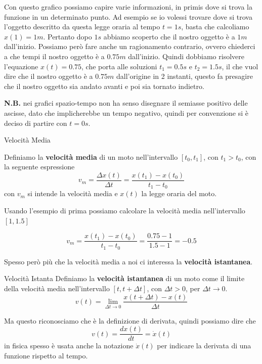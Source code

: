 \documentclass{rapport}
\begin{document}
Con questo grafico possiamo capire varie informazioni, in primis dove si trova la funzione in un determinato punto. Ad esempio se io volessi trovare dove si trova l'oggetto descritto da questa legge oraria al tempo $t=1s$, basta che calcoliamo $x(1)=1m$. Pertanto dopo $1s$ abbiamo scoperto che il nostro oggetto è a $1m$ dall'inizio.  Possiamo però fare anche un ragionamento contrario, ovvero chiederci a che tempi il nostro oggetto è a $0.75m$ dall'inizio. Quindi dobbiamo risolvere l'equazione $x(t)=0.75$, che porta alle soluzioni $t_1=0.5s $ e $t_2 = 1.5s$, il che vuol dire che il nostro oggetto è a $0.75m$ dall'origine in 2 instanti, questo fa presagire che il nostro oggetto sia andato avanti e poi sia tornato indietro.

\textbf{N.B.} nei grafici spazio-tempo non ha senso disegnare il semiasse positivo delle ascisse, dato che implicherebbe un tempo negativo, quindi per convenzione si è deciso di partire con $t=0s$. 


\begin{definizione}{Velocità Media}{}
  Definiamo la \textbf{velocità media} di un moto nell'intervallo $[t_0, t_1]$, con $t_1 > t_0$, con la seguente espressione 
  \begin{equation*}
    v_m = \dfrac{\Delta x(t)}{\Delta t} = \dfrac{x(t_1) - x(t_0)}{t_1-t_0}
  \end{equation*}
  con $v_m$ si intende la velocità media e $x(t)$ la legge oraria del moto.
\end{definizione}

Usando l'esempio di prima possiamo calcolare la velocità media nell'intervallo $[1,1.5]$

\[
v_m = \dfrac{x(t_1) - x(t_0)}{t_1-t_0} = \dfrac{0.75 - 1}{1.5-1}= -0.5
\]

Spesso però più che la velocità media a noi ci interessa la \textbf{velocità istantanea}.

\begin{definizione}{Velocità Istanta}{}
  Definiamo la \textbf{velocità istantanea} di un moto come il limite della velocità media nell'intervallo $[t, t + \Delta t]$, con $\Delta t>0$, per $\Delta t \to 0$.
  \[
  v(t) = \lim_{\Delta t \to 0} \dfrac{x(t+\Delta t)-x(t)}{\Delta t}
  \]

  Ma questo riconosciamo che è la definizione di derivata, quindi possiamo dire che 
  \[
  v(t) = \dfrac{d x(t)}{dt}=\dot{x}(t)
  \]
  in fisica spesso è usata anche la notazione $\dot{x}(t)$ per indicare la derivata di una funzione rispetto al tempo.
\end{definizione}
\end{document}
